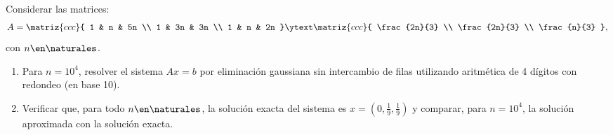 \begin{enunciado}{\ejercicio}
  Considerar las matrices:
  $$
    A =
    \matriz{ccc}{
      1 & n & 5n \\
      1 & 3n & 3n \\
      1 & n & 2n
    }
    \ytext
    \matriz{ccc}{
      \frac{2n}{3} \\
      \frac{2n}{3} \\
      \frac{n}{3}
    },
  $$
  con $n \en \naturales$.
  \begin{enumerate}[label=\alph*)]
    \item Para $n = 10^4$, resolver el sistema $Ax = b$ por eliminación gaussiana sin intercambio de filas utilizando
          aritmética de 4 dígitos con redondeo (en base 10).

    \item Verificar que, para todo $n \en \naturales$, la solución exacta del sistema es $x = (0, \frac{1}{9}, \frac{1}{9})$
          y comparar, para $n = 10^4$, la solución aproximada con la solución exacta.
  \end{enumerate}
\end{enunciado}

\hacer
